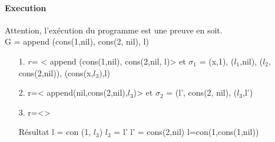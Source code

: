 \paragraph{Execution}
Attention, l'exécution du programme est une preuve en soit.\\
G = append (cons(1,nil), cons(2, nil), l)
\begin{itemize}
\item[1.] 
		$r$= < append (cons(1,nil), cons(2,nil, l)> et
		$\sigma_1$ = {(x,1), ($l_1$,nil), ($l_2$, cons(2,nil)), (cons(x,$l_3$),l)}
\item[2.]
		r=< append(nil,cons(2,nil),$l_3$)> et
		$\sigma_2$ = { (l', cons(2, nil), ($l_3$,l') }
		
\item[3.]
		r=<>
		
\item[Résultat]
l = con (1, $l_3$)
$l_3$ = l'
l' = cons(2,nil)
l=con(1,cons(1,nil))


\end{itemize}
